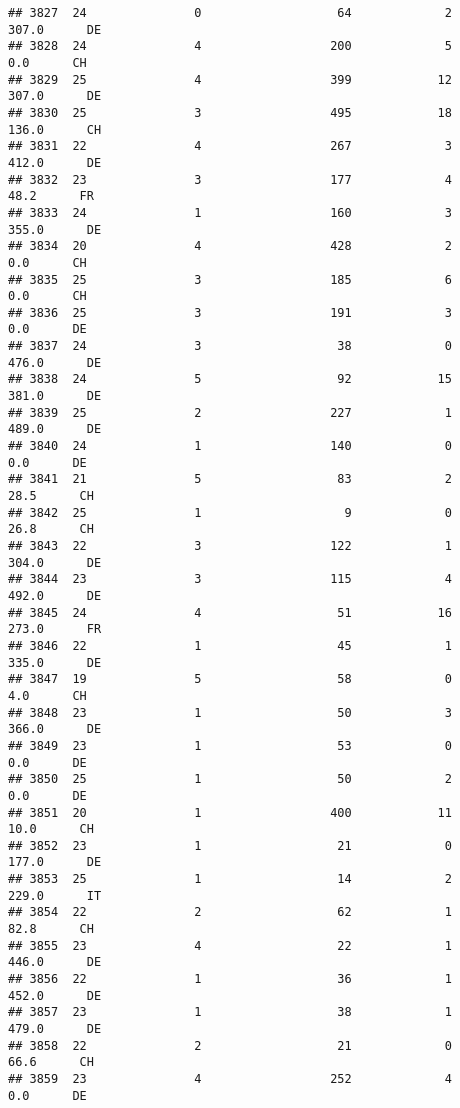 \documentclass[
]{article}
\begin{document}
\begin{verbatim}
## 3827  24               0                   64             2    307.0      DE
## 3828  24               4                  200             5      0.0      CH
## 3829  25               4                  399            12    307.0      DE
## 3830  25               3                  495            18    136.0      CH
## 3831  22               4                  267             3    412.0      DE
## 3832  23               3                  177             4     48.2      FR
## 3833  24               1                  160             3    355.0      DE
## 3834  20               4                  428             2      0.0      CH
## 3835  25               3                  185             6      0.0      CH
## 3836  25               3                  191             3      0.0      DE
## 3837  24               3                   38             0    476.0      DE
## 3838  24               5                   92            15    381.0      DE
## 3839  25               2                  227             1    489.0      DE
## 3840  24               1                  140             0      0.0      DE
## 3841  21               5                   83             2     28.5      CH
## 3842  25               1                    9             0     26.8      CH
## 3843  22               3                  122             1    304.0      DE
## 3844  23               3                  115             4    492.0      DE
## 3845  24               4                   51            16    273.0      FR
## 3846  22               1                   45             1    335.0      DE
## 3847  19               5                   58             0      4.0      CH
## 3848  23               1                   50             3    366.0      DE
## 3849  23               1                   53             0      0.0      DE
## 3850  25               1                   50             2      0.0      DE
## 3851  20               1                  400            11     10.0      CH
## 3852  23               1                   21             0    177.0      DE
## 3853  25               1                   14             2    229.0      IT
## 3854  22               2                   62             1     82.8      CH
## 3855  23               4                   22             1    446.0      DE
## 3856  22               1                   36             1    452.0      DE
## 3857  23               1                   38             1    479.0      DE
## 3858  22               2                   21             0     66.6      CH
## 3859  23               4                  252             4      0.0      DE

\end{verbatim}
\end{document}
